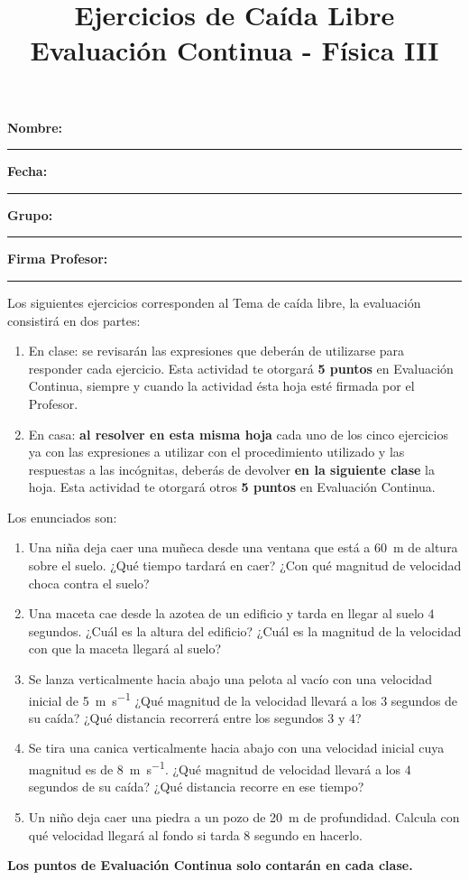 \documentclass[14pt]{extarticle}
\title{\vspace*{-2cm} Ejercicios de Caída Libre \\  Evaluación Continua - Física III\vspace{-5ex}}
\date{}
\begin{document}
\maketitle

\textbf{Nombre:} \rule{7cm}{0.1mm} \textbf{Fecha:} \rule{3cm}{0.1mm} 

\vspace*{0.4cm}
\textbf{Grupo:} \rule{3cm}{0.1mm} \hspace{1.5cm} \textbf{Firma Profesor:} \rule{4cm}{0.1mm}

\vspace{1cm}

Los siguientes ejercicios corresponden al Tema de caída libre, la evaluación consistirá en dos partes:
\begin{enumerate}[label=\alph*)]
\item En clase: se revisarán las expresiones que deberán de utilizarse para responder cada ejercicio. Esta actividad te otorgará \textbf{5 puntos} en Evaluación Continua, siempre y cuando la actividad ésta hoja esté firmada por el Profesor.
\item En casa: \textbf{al resolver en esta misma hoja} cada uno de los cinco ejercicios ya con las expresiones a utilizar con el procedimiento utilizado y las respuestas a las incógnitas, deberás de devolver \textbf{en la siguiente clase} la hoja. Esta actividad te otorgará otros \textbf{5 puntos} en Evaluación Continua.
\end{enumerate}

Los enunciados son:
\begin{enumerate}
\item Una niña deja caer una muñeca desde una ventana que está a \SI{60}{\meter} de altura sobre el suelo. ¿Qué tiempo tardará en caer? ¿Con qué magnitud de velocidad choca contra el suelo?
\item Una maceta cae desde la azotea de un edificio y tarda en llegar al suelo $4$ segundos. ¿Cuál es la altura del edificio? ¿Cuál es la magnitud de la velocidad con que la maceta llegará al suelo?
\item Se lanza verticalmente hacia abajo una pelota al vacío con una velocidad inicial de \SI{5}{\meter\per\second} ¿Qué magnitud de la velocidad llevará a los 3 segundos de su caída? ¿Qué distancia recorrerá entre los segundos $3$ y $4$?
\item Se tira una canica verticalmente hacia abajo con una velocidad inicial cuya magnitud es de \SI{8}{\meter\per\second}. ¿Qué magnitud de velocidad llevará a los $4$ segundos de su caída? ¿Qué distancia recorre en ese tiempo?
\item Un niño deja caer una piedra a un pozo de \SI{20}{\meter} de profundidad. Calcula con qué velocidad llegará al fondo si tarda $8$ segundo en hacerlo.
\end{enumerate}
\textbf{Los puntos de Evaluación Continua solo contarán en cada clase.}
\end{document}
